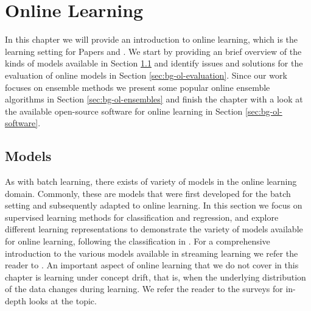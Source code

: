\chapter{Online Learning}
\label{ch:bg-online-learning}

In this chapter we will provide an introduction to online learning, which is the learning
setting for Papers \boostvhtNum and \uncertaintreesNum. We start by providing an brief
overview of the kinds of models available in Section \ref{sec:bg-ol-models}
and identify issues and solutions for the evaluation of online models in Section \ref{sec:bg-ol-evaluation}.
Since our work focuses on ensemble methods we present some popular online ensemble algorithms in Section
\ref{sec:bg-ol-ensembles} and finish the chapter with a look at the available
open-source software for online learning in Section \ref{sec:bg-ol-software}.

\section{Models}
\label{sec:bg-ol-models}

As with batch learning, there exists of variety of models in the online
learning domain. Commonly, these are models that were first developed
for the batch setting and subsequently adapted to online learning.
In this section we focus on supervised learning methods for
classification and regression, and explore different
learning representations to demonstrate the variety of
models available for online learning, following the
classification in \cite{onlineML}. For a comprehensive
introduction to the various models available in streaming
learning we refer the reader to \cite{moa-book}.
An important aspect of online learning that we do not cover in this chapter is learning
under concept drift, that is, when the underlying distribution
of the data changes during learning. We refer the reader
to the surveys \cite{concept-drift-survey-indre, concept-drift-survey-gama}
for in-depth looks at the topic.

